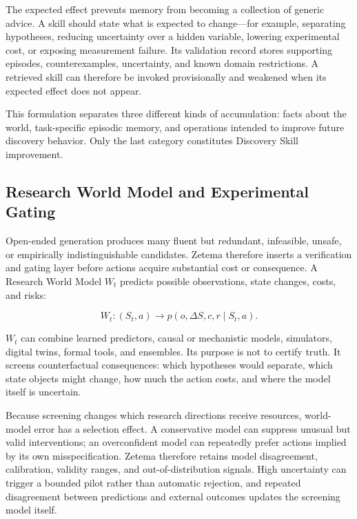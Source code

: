 \documentclass[11pt, a4paper, copyright]{google}
\begin{document}
The expected effect prevents memory from becoming a collection of generic advice. A skill should state what is expected to change---for example, separating hypotheses, reducing uncertainty over a hidden variable, lowering experimental cost, or exposing measurement failure. Its validation record stores supporting episodes, counterexamples, uncertainty, and known domain restrictions. A retrieved skill can therefore be invoked provisionally and weakened when its expected effect does not appear.

This formulation separates three different kinds of accumulation: facts about the world, task-specific episodic memory, and operations intended to improve future discovery behavior. Only the last category constitutes Discovery Skill improvement.

\subsection{Research World Model and Experimental Gating}
\label{subsec:world-model-verification}

Open-ended generation produces many fluent but redundant, infeasible, unsafe, or empirically indistinguishable candidates. Zetema therefore inserts a verification and gating layer before actions acquire substantial cost or consequence. A Research World Model $W_t$ predicts possible observations, state changes, costs, and risks:

\begin{equation}
W_t:(S_t,a)\longrightarrow p(o,\Delta S,c,r\mid S_t,a).
\label{eq:research-world-model}
\end{equation}

$W_t$ can combine learned predictors, causal or mechanistic models, simulators, digital twins, formal tools, and ensembles. Its purpose is not to certify truth. It screens counterfactual consequences: which hypotheses would separate, which state objects might change, how much the action costs, and where the model itself is uncertain.

Because screening changes which research directions receive resources, world-model error has a selection effect. A conservative model can suppress unusual but valid interventions; an overconfident model can repeatedly prefer actions implied by its own misspecification. Zetema therefore retains model disagreement, calibration, validity ranges, and out-of-distribution signals. High uncertainty can trigger a bounded pilot rather than automatic rejection, and repeated disagreement between predictions and external outcomes updates the screening model itself.
\end{document}
